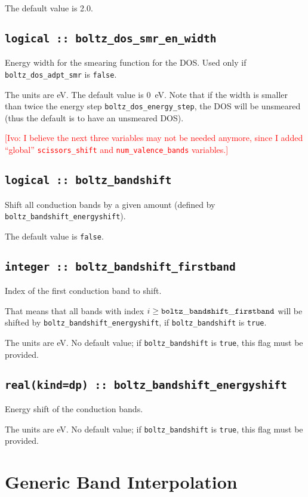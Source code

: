 The default value is 2.0.

\subsection[boltz\_dos\_smr\_en\_width]{\tt logical :: boltz\_dos\_smr\_en\_width}
Energy width for the smearing function for the DOS. Used only if {\tt boltz\_dos\_adpt\_smr} is \verb#false#.

The units are eV.
The default value is 0~eV. Note that if the width is smaller than twice the energy step {\tt boltz\_dos\_energy\_step}, the DOS will be unsmeared (thus the default is to have an unsmeared DOS).

\textcolor{red}{[Ivo: I believe the next three variables may not be
  needed anymore, since I added ``global'' {\tt scissors\_shift} and
  {\tt num\_valence\_bands} variables.]}

\subsection[boltz\_bandshift]{\tt logical :: boltz\_bandshift}
Shift all conduction bands by a given amount (defined by {\tt boltz\_bandshift\_energyshift}).

The default value is \verb#false#.

\subsection[boltz\_bandshift\_firstband]{\tt integer :: boltz\_bandshift\_firstband}
Index of the first conduction band to shift.

That means that all bands with index $i\ge {\tt boltz\_bandshift\_firstband}$ will be shifted by  {\tt boltz\_bandshift\_energyshift}, if {\tt boltz\_bandshift} is \verb#true#.

The units are eV.
No default value; if {\tt boltz\_bandshift} is \verb#true#, this flag must be provided.

\subsection[boltz\_bandshift\_energyshift]{\tt real(kind=dp) :: boltz\_bandshift\_energyshift}
Energy shift of the conduction bands.

The units are eV.
No default value; if {\tt boltz\_bandshift} is \verb#true#, this flag must be provided.


\section{Generic Band Interpolation}
